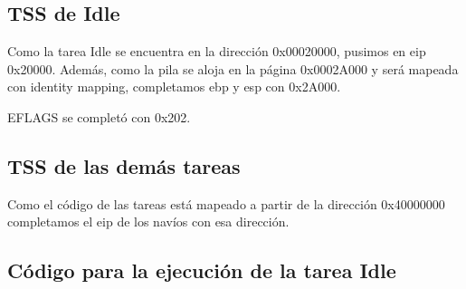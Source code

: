 \subsection*{TSS de Idle}
\par{Como la tarea Idle se encuentra en la dirección 0x00020000, pusimos en eip 0x20000. Además, como la pila se aloja en la página 0x0002A000 y será mapeada con identity mapping, completamos ebp y esp con 0x2A000.}
\par{EFLAGS se completó con 0x202.}

\subsection*{TSS de las demás tareas}
\par{Como el código de las tareas está mapeado a partir de la dirección 0x40000000 completamos el eip de los navíos con esa dirección.}

\subsection*{Código para la ejecución de la tarea Idle}
\par{}


\clearpage